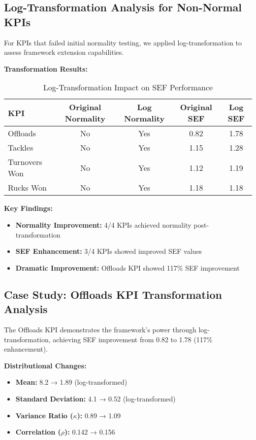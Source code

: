\subsection{Log-Transformation Analysis for Non-Normal KPIs}

For KPIs that failed initial normality testing, we applied log-transformation to assess framework extension capabilities.

\textbf{Transformation Results:}
\begin{table}[h]
\centering
\caption{Log-Transformation Impact on SEF Performance}
\begin{tabular}{lcccc}
\hline
\textbf{KPI} & \textbf{Original Normality} & \textbf{Log Normality} & \textbf{Original SEF} & \textbf{Log SEF} \\
\hline
Offloads & No & Yes & 0.82 & 1.78 \\
Tackles & No & Yes & 1.15 & 1.28 \\
Turnovers Won & No & Yes & 1.12 & 1.19 \\
Rucks Won & No & Yes & 1.18 & 1.18 \\
\hline
\end{tabular}
\end{table}

\textbf{Key Findings:}
\begin{itemize}
    \item \textbf{Normality Improvement:} 4/4 KPIs achieved normality post-transformation
    \item \textbf{SEF Enhancement:} 3/4 KPIs showed improved SEF values
    \item \textbf{Dramatic Improvement:} Offloads KPI showed 117\% SEF improvement
\end{itemize}

\subsection{Case Study: Offloads KPI Transformation Analysis}

The Offloads KPI demonstrates the framework's power through log-transformation, achieving SEF improvement from 0.82 to 1.78 (117\% enhancement).

\textbf{Distributional Changes:}
\begin{itemize}
    \item \textbf{Mean:} 8.2 → 1.89 (log-transformed)
    \item \textbf{Standard Deviation:} 4.1 → 0.52 (log-transformed)
    \item \textbf{Variance Ratio ($\kappa$):} 0.89 → 1.09
    \item \textbf{Correlation ($\rho$):} 0.142 → 0.156
\end{itemize}

